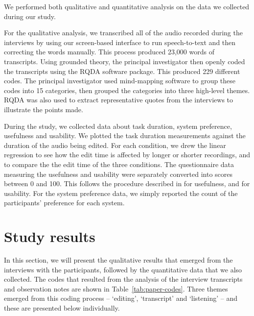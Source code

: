 We performed both qualitative and quantitative analysis on the data we collected during our study.

For the qualitative analysis, we transcribed all of the audio recorded during the interviews by using our screen-based
interface to run speech-to-text and then correcting the words manually. This process produced 23,000 words of
transcripts. Using grounded theory, the principal investigator then openly coded the transcripts using the RQDA
software package. This produced 229 different codes. The principal investigator used mind-mapping software to group
these codes into 15 categories, then grouped the categories into three high-level themes. RQDA was also used to extract
representative quotes from the interviews to illustrate the points made.

During the study, we collected data about task duration, system preference, usefulness and usability.
We plotted the task duration measurements against the duration of the audio being edited. For each condition, we drew
the linear regression to see how the edit time is affected by longer or shorter recordings, and to compare the the edit
time of the three conditions.
The questionnaire data measuring the usefulness and usability were separately converted into scores between 0 and 100.
This follows the procedure described in \citet{Davis1989} for usefulness, and \citet{Brooke1996} for usability.
For the system preference data, we simply reported the count of the participants' preference for each system.

\section{Study results}\label{sec:paper-results}

In this section, we will present the qualitative results that emerged from the interviews with the participants,
followed by the quantitative data that we also collected.  The codes that resulted from the analysis of the interview
transcripts and observation notes are shown in Table~\ref{tab:paper-codes}. Three themes emerged from this coding
process -- `editing', `transcript' and `listening' -- and these are presented below individually. 

